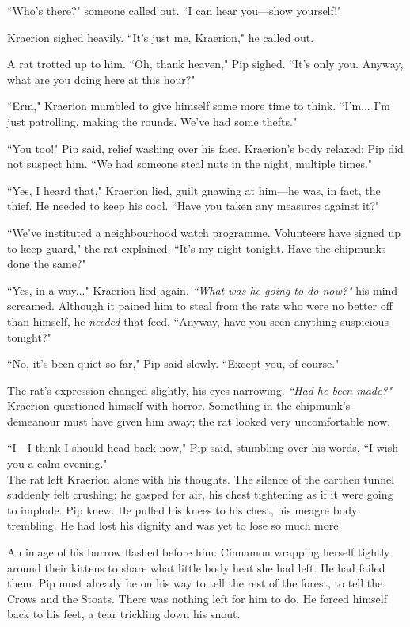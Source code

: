 ``Who's there?" someone called out.
``I can hear you---show yourself!"

Kraerion sighed heavily.
``It's just me, Kraerion," he called out.

A rat trotted up to him.
``Oh, thank heaven," Pip sighed.
``It's only you.
Anyway, what are you doing here at this hour?"

``Erm," Kraerion mumbled to give himself some more time to think.
``I'm... I'm just patrolling, making the rounds.
We've had some thefts."

``You too!" Pip said, relief washing over his face.
Kraerion's body relaxed; Pip did not suspect him.
``We had someone steal nuts in the night, multiple times."

``Yes, I heard that," Kraerion lied, guilt gnawing at him---he was, in fact, the thief.
He needed to keep his cool.
``Have you taken any measures against it?"

``We've instituted a neighbourhood watch programme.
Volunteers have signed up to keep guard," the rat explained.
``It's my night tonight.
Have the chipmunks done the same?"

``Yes, in a way..." Kraerion lied again. \textit{``What was he going to do now?"} his mind screamed.
Although it pained him to steal from the rats who were no better off than himself, he \textit{needed} that feed.
``Anyway, have you seen anything suspicious tonight?"

``No, it's been quiet so far," Pip said slowly.
``Except you, of course."

The rat's expression changed slightly, his eyes narrowing. \textit{``Had he been made?"} Kraerion questioned himself with horror.
Something in the chipmunk's demeanour must have given him away; the rat looked very uncomfortable now.

``I---I think I should head back now," Pip said, stumbling over his words.
``I wish you a calm evening."\\

The rat left Kraerion alone with his thoughts.
The silence of the earthen tunnel suddenly felt crushing; he gasped for air, his chest tightening as if it were going to implode.
Pip knew.
He pulled his knees to his chest, his meagre body trembling.
He had lost his dignity and was yet to lose so much more.

An image of his burrow flashed before him: Cinnamon wrapping herself tightly around their kittens to share what little body heat she had left.
He had failed them.
Pip must already be on his way to tell the rest of the forest, to tell the Crows and the Stoats.
There was nothing left for him to do.
He forced himself back to his feet, a tear trickling down his snout.

